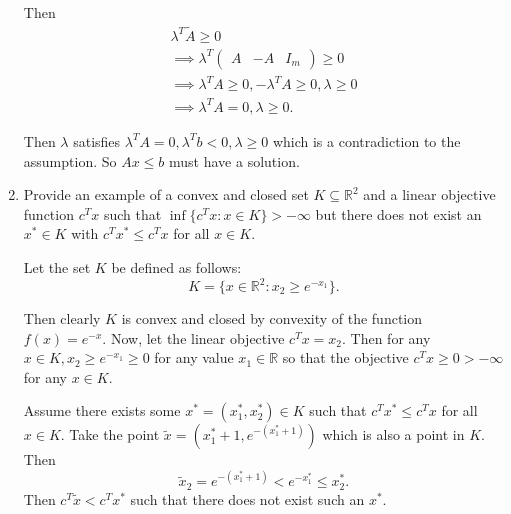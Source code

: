 \documentclass[11pt]{article}
\newcommand{\setR}{\mathbb{R}}
\renewcommand{\leq}{\leqslant}
\renewcommand{\geq}{\geqslant}
\begin{document}
\begin{enumerate}[1)]
\begin{solution}
  Then 
  \begin{align*}
  \lambda^T \tilde{A} \geq 0 \\
  \implies \lambda^T\begin{pmatrix} A & -A & I_m \end{pmatrix} \geq 0 \\
  \implies \lambda^TA \geq 0, -\lambda^T A \geq 0, \lambda \geq 0 \\
  \implies \lambda^T A = 0, \lambda \geq 0.
  \end{align*}
  
  Then $\lambda$ satisfies $\lambda^TA = 0, \lambda^T b < 0, \lambda \geq 0$ which is a contradiction to the assumption. So $Ax \leq b$ must have a solution. 
  
  
  
  
  \end{solution}
  
  
  
  \item Provide an example of a convex and closed  set $K\subseteq\setR^2$ and a
  linear objective function $c^Tx$ such that $\inf\{c^Tx \colon
  x\in K\}>-\infty$ but there does not exist an $x^* \in K$ with $c^Tx^* \leq
  c^Tx$ for all $x \in K$. 
  
  
  \begin{solution}
  Let the set $K$ be defined as follows:
  $$K = \{x \in \setR^2: x_2 \geq e^{-x_1} \}.$$
  
  
  Then clearly $K$ is convex and closed by convexity of the function $f(x) = e^{-x}$. Now, let the linear objective $c^Tx = x_2$. Then for any $x \in K, x_2 \geq e^{-x_1} \geq 0$ for any value $x_1 \in \setR$ so that the objective $c^Tx \geq 0 > -\infty$ for any $x \in K$. 
  
  
 Assume there exists some $x^\ast = (x^\ast_1, x^\ast_2) \in K$ such that $c^Tx^\ast \leq c^Tx$ for all $x \in K$. Take the point $\tilde{x} = (x^\ast_1  + 1, e^{-(x^\ast_1 + 1)})$ which is also a point in $K$. Then $$\tilde{x}_2 = e^{-(x^\ast_1 + 1)} < e^{-x^\ast_1} \leq x^\ast_2.$$ Then $c^T \tilde{x} < c^T x^\ast$ such that there does not exist such an $x^\ast$. 
  
  
  \end{solution}
  
  
  

\end{enumerate}
\end{document}
